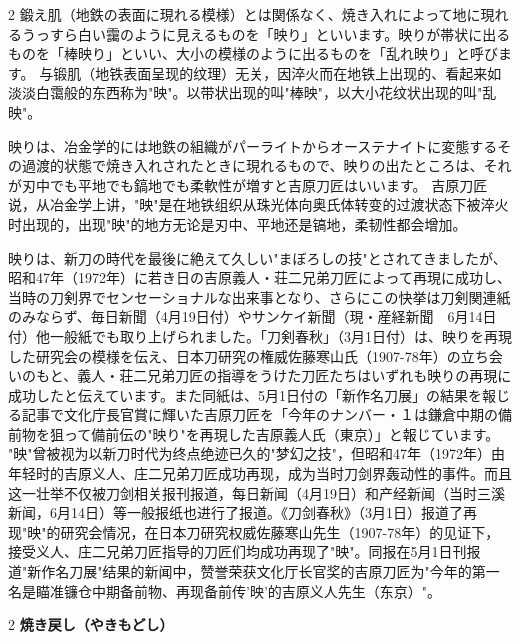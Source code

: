 \documentclass[12pt,UTF8]{ctexbook}
\newcommand{\dq}{"}
\begin{document}
\begin{paracol}{2}
鍛え肌（地鉄の表面に現れる模様）とは関係なく、焼き入れによって地に現れるうっすら白い靄のように見えるものを「映り」といいます。映りが帯状に出るものを「棒映り」といい、大小の模様のように出るものを「乱れ映り」と呼びます。
\switchcolumn*
与锻肌（地铁表面呈现的纹理）无关，因淬火而在地铁上出现的、看起来如淡淡白霭般的东西称为"映"。以带状出现的叫"棒映"，以大小花纹状出现的叫"乱映"。
\switchcolumn*

映りは、冶金学的には地鉄の組織がパーライトからオーステナイトに変態するその過渡的状態で焼き入れされたときに現れるもので、映りの出たところは、それが刃中でも平地でも鎬地でも柔軟性が増すと吉原刀匠はいいます。
\switchcolumn*
吉原刀匠说，从冶金学上讲，"映"是在地铁组织从珠光体向奥氏体转变的过渡状态下被淬火时出现的，出现"映"的地方无论是刃中、平地还是镐地，柔韧性都会增加。
\switchcolumn*

映りは、新刀の時代を最後に絶えて久しい\dq まぼろしの技\dq とされてきましたが、昭和47年（1972年）に若き日の吉原義人・荘二兄弟刀匠によって再現に成功し、当時の刀剣界でセンセーショナルな出来事となり、さらにこの快挙は刀剣関連紙のみならず、毎日新聞（4月19日付）やサンケイ新聞（現・産経新聞　6月14日付）他一般紙でも取り上げられました。「刀剣春秋」（3月1日付）は、映りを再現した研究会の模様を伝え、日本刀研究の権威佐藤寒山氏（1907-78年）の立ち会いのもと、義人・荘二兄弟刀匠の指導をうけた刀匠たちはいずれも映りの再現に成功したと伝えています。また同紙は、5月1日付の「新作名刀展」の結果を報じる記事で文化庁長官賞に輝いた吉原刀匠を「今年のナンバー・１は鎌倉中期の備前物を狙って備前伝の\dq 映り\dq を再現した吉原義人氏（東京）」と報じています。
\switchcolumn*
"映"曾被视为以新刀时代为终点绝迹已久的"梦幻之技"，但昭和47年（1972年）由年轻时的吉原义人、庄二兄弟刀匠成功再现，成为当时刀剑界轰动性的事件。而且这一壮举不仅被刀剑相关报刊报道，每日新闻（4月19日）和产经新闻（当时三溪新闻，6月14日）等一般报纸也进行了报道。《刀剑春秋》（3月1日）报道了再现"映"的研究会情况，在日本刀研究权威佐藤寒山先生（1907-78年）的见证下，接受义人、庄二兄弟刀匠指导的刀匠们均成功再现了"映"。同报在5月1日刊报道"新作名刀展"结果的新闻中，赞誉荣获文化厅长官奖的吉原刀匠为"今年的第一名是瞄准镰仓中期备前物、再现备前传'映'的吉原义人先生（东京）"。
\end{paracol}

\vspace{0.5em}

\begin{paracol}{2}
{\bfseries 焼き戻し（やきもどし）}
\end{paracol}
\end{document}
